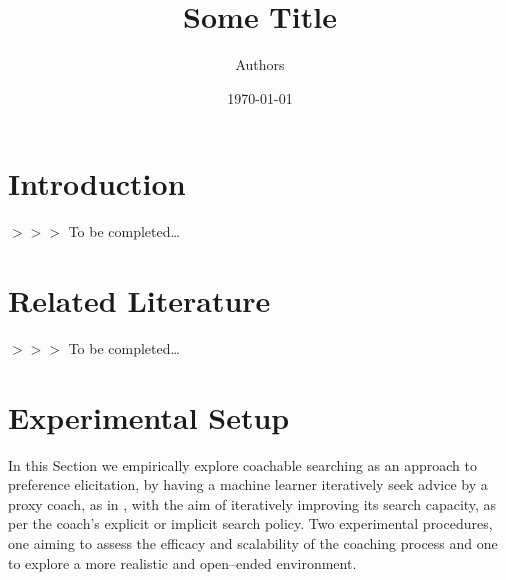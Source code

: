 \documentclass[a4paper, 10pt]{article}
\title{Some Title}
\author{Authors}
\date{\today}
\newcommand{\edcom}[1]{{\sf\color{red}$>>>$ #1}}
\newcommand{\tbc}{\edcom{To be completed\ldots}}
\newcommand{\ednote}[1]{\marginpar{\flushleft\tiny\sf\color{red}{#1}}}
\begin{document}
	\maketitle
	\section{Introduction}\label{sec:introduction}
	\tbc
	\section{Related Literature}\label{sec:related-literature}
	\tbc
	\section{Experimental Setup}\label{sec:experimental-setup}
	In this Section we empirically explore coachable searching as an approach to preference elicitation, by having a machine learner iteratively seek advice by a proxy coach, as in \cite{}, with the aim of iteratively improving its search capacity, as per the coach's explicit or implicit search policy. Two experimental procedures, one aiming to assess the efficacy and scalability of the coaching process and one to explore a more realistic and open--ended environment.\ednote{Add a few words about how coaching happens in the context of searching, i.e., how from a past sub--optimal state the coach provides a piece of advice according to their (implicit / explicit) policy that improves the state towards a(n implicit / explicit) goal.}
\end{document}
